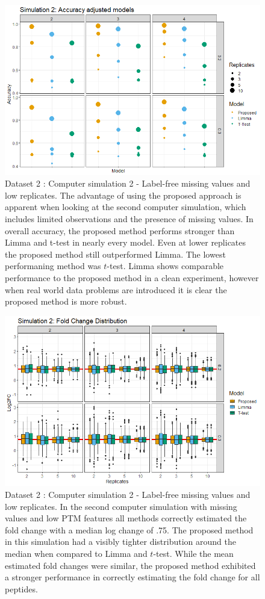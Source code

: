 \documentclass[mcp]{article}
\numberwithin{figure}{section} %
\numberwithin{table}{section}
\begin{document}
\begin{figure}[ht]
\centering
\includegraphics[width=1\textwidth]{images/sim3_Accuracy.png}
\caption{Dataset 2 : Computer simulation 2 - Label-free missing values and low replicates. The advantage of using the proposed approach is apparent when looking at the second computer simulation, which includes limited observations and the presence of missing values. In overall accuracy, the proposed method performs stronger than Limma and t-test in nearly every model. Even at lower replicates the proposed method still outperformed Limma. The lowest performaning method was $t$-test. Limma shows comparable performance to the proposed method in a clean experiment, however when real world data problems are introduced it is clear the proposed method is more robust.}
\label{fig:sim_accuracy}
\end{figure}

\begin{figure}[ht]
\centering
\includegraphics[width=1\textwidth]{images/sim3_FC_boxplot.png}
\caption{Dataset 2 : Computer simulation 2 - Label-free missing values and low replicates. In the second computer simulation with missing values and low PTM features all methods correctly estimated the fold change with a median log change of .75. The proposed method in this simulation had a visibly tighter distribution around the median when compared to Limma and $t$-test. While the mean estimated fold changes were similar, the proposed method exhibited a stronger performance in correctly estimating the fold change for all peptides.}
\label{fig:sim_boxplot}
\end{figure}
\end{document}
